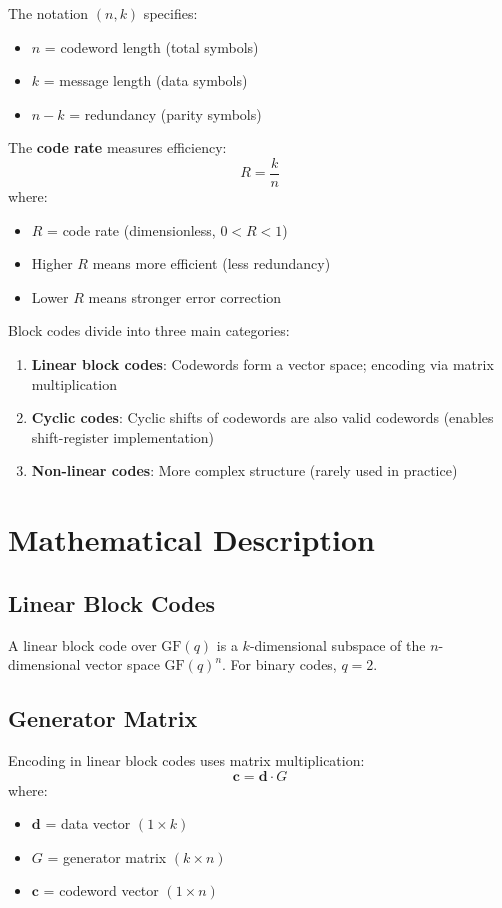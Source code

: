 The notation $(n,k)$ specifies:
\begin{itemize}
\item $n$ = codeword length (total symbols)
\item $k$ = message length (data symbols)
\item $n-k$ = redundancy (parity symbols)
\end{itemize}

The \textbf{code rate} measures efficiency:
\begin{equation}
R = \frac{k}{n}
\end{equation}
where:
\begin{itemize}
\item $R$ = code rate (dimensionless, $0 < R < 1$)
\item Higher $R$ means more efficient (less redundancy)
\item Lower $R$ means stronger error correction
\end{itemize}

Block codes divide into three main categories:
\begin{enumerate}
\item \textbf{Linear block codes}: Codewords form a vector space; encoding via matrix multiplication
\item \textbf{Cyclic codes}: Cyclic shifts of codewords are also valid codewords (enables shift-register implementation)
\item \textbf{Non-linear codes}: More complex structure (rarely used in practice)
\end{enumerate}

\section{Mathematical Description}

\subsection{Linear Block Codes}

A linear block code over $\mathrm{GF}(q)$ is a $k$-dimensional subspace of the $n$-dimensional vector space $\mathrm{GF}(q)^n$. For binary codes, $q=2$.

\subsection{Generator Matrix}

Encoding in linear block codes uses matrix multiplication:
\begin{equation}
\mathbf{c} = \mathbf{d} \cdot G
\end{equation}
where:
\begin{itemize}
\item $\mathbf{d}$ = data vector $(1 \times k)$
\item $G$ = generator matrix $(k \times n)$
\item $\mathbf{c}$ = codeword vector $(1 \times n)$
\end{itemize}

